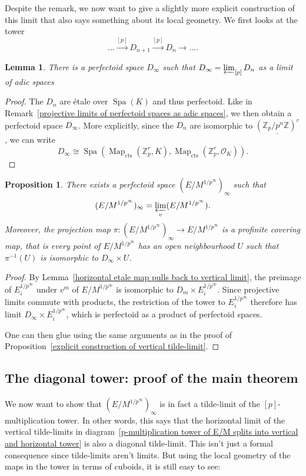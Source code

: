 \documentclass[10pt,oneside]{amsart}
\newtheorem{lemma}[theorem]{Lemma}
\newtheorem{proposition}[theorem]{Proposition}
\theoremstyle{definition}
\begin{document}
	Despite the remark, we now want to give a slightly more explicit construction of this limit that also says something about its local geometry. We first looks at the tower
	\[\dots \xrightarrow{[p]}D_{n+1}\xrightarrow{[p]}D_n\rightarrow\dots.\]
	\begin{lemma}
		There is a perfectoid space $D_\infty$ such that $D_\infty = \varprojlim_{[p]} D_n$ as a limit of adic spaces
	\end{lemma}
	\begin{proof}
		The $D_n$ are \'etale over $\operatorname{Spa}(K)$ and thus perfectoid.
		Like in Remark~\ref{projective limits of perfectoid spaces as adic spaces}, we then obtain a perfectoid space $D_\infty$. More explicitly, since the $D_n$ are isomorphic to $\underline {(\mathbb Z_p/p^{n}\mathbb Z)^r}$, we can write \[D_\infty \cong\operatorname{Spa}(\operatorname{Map}_{\operatorname{cts}}(\mathbb Z_p^r,K),\operatorname{Map}_{\operatorname{cts}}(\mathbb Z_p^r,\mathcal O_K)).\]
	\end{proof}
	\begin{proposition}\label{horizontal limit of vertical limit}
	There exists a perfectoid space $(E/M^{1/p^\infty})_\infty$ such that \[(E/M^{1/p^\infty})_\infty= \varprojlim_{v}(E/M^{1/p^\infty}).\]
	 Moreover, the projection map $\pi:(E/M^{1/p^\infty})_\infty\rightarrow E/M^{1/p^\infty}$ is a profinite covering map, that is every point of $E/M^{1/p^\infty}$ has an open neighbourhood $U$ such that $\pi^{-1}(U)$ is isomorphic to $D_\infty \times U$.
	\end{proposition}
	\begin{proof}
	By Lemma~\ref{horizontal etale map pulls back to vertical limit}, the preimage of $E_i^{1/p^\infty}$ under $v^m$ of $E/M^{1/p^\infty}$ is isomorphic to $D_m\times E_i^{1/p^\infty}$. Since projective limits commute with products, the restriction of the tower to $E_i^{1/p^\infty}$ therefore has limit $D_\infty \times E_i^{1/p^\infty}$, which is perfectoid as a product of perfectoid spaces. 
	
	One can then glue using the same arguments as in the proof of Proposition~\ref{explicit construction of vertical tilde-limit}.
	\end{proof}
	
	\subsection{The diagonal tower: proof of the main theorem}
	We now want to show that $(E/M^{1/p^\infty})_\infty$ is in fact a tilde-limit of the $[p]$-multiplication tower. In other words, this says that the horizontal limit of the vertical tilde-limits in diagram~\ref{p-multiplication tower of E/M splits into vertical and horizontal tower} is also a diagonal tilde-limit.
	This isn't just a formal consequence since tilde-limits aren't limits. But using the local geometry of the maps in the tower in terms of cuboids, it is still easy to see:
	
\end{document}
